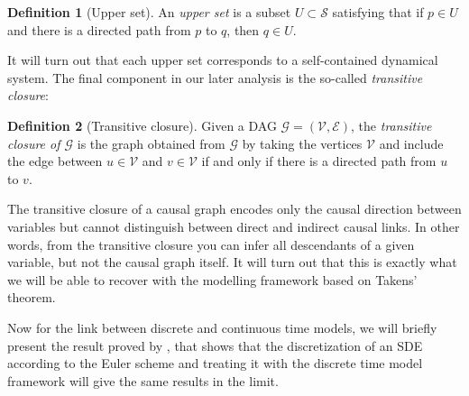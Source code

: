 \documentclass[11pt, a4paper]{memoir}
\theoremstyle{plain}
\theoremstyle{definition}
\newtheorem{defn}{Definition}
\begin{document}
\begin{defn}[Upper set]
An \emph{upper set} is a subset $U\subset \mathcal{S}$ satisfying that if $p\in U$ and there is a directed path from $p$ to $q$, then $q\in U$.
\end{defn}
It will turn out that each upper set corresponds to a self-contained dynamical system. The final component in our later analysis is the so-called \textit{transitive closure}:
\begin{defn}[Transitive closure]
Given a DAG $\mathcal{G}=(\mathcal{V},\mathcal{E})$, the \emph{transitive  closure of $\mathcal{G}$} is the graph obtained from $\mathcal{G}$ by taking the vertices $\mathcal{V}$ and include the edge between $u\in \mathcal{V}$ and $v\in \mathcal{V}$ if and only if there is a directed path from $u$ to $v$.
\end{defn}
The transitive closure of a causal graph encodes only the causal direction between variables but cannot distinguish between direct and indirect causal links. In other words, from the transitive closure you can infer all descendants of a given variable, but not the causal graph itself. It will turn out that this is exactly what we will be able to recover with the modelling framework based on Takens' theorem.

Now for the link between discrete and continuous time models, we will briefly present the result proved by \cite{sokol2014}, that shows that the discretization of an SDE according to the Euler scheme and treating it with the discrete time model framework will give the same results in the limit.
\end{document}
